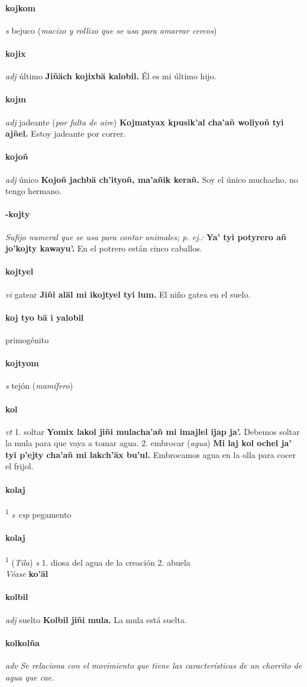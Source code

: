 \documentclass{scrbook}
\newcommand{\entry}[1]{\paragraph{#1}}
\newcommand{\onedefinition}[1]{#1.}
\newcommand{\defsuperscript}[1]{\textsuperscript{1}}
\newcommand{\nontranslationdef}[1]{\textit{#1}}
\newcommand{\partofspeech}[1]{\textit{#1}}
\newcommand{\spanishtranslation}[1]{#1}
\newcommand{\clarification}[1]{(\textit{#1})}
\newcommand{\cholexample}[1]{\textbf{#1}}
\newcommand{\exampletranslation}[1]{#1}
\newcommand{\alsosee}[1]{\\\textit{Véase} \textbf{#1}}
\newcommand{\relevantdialect}[1]{(\textit{#1})}
\begin{document}
\begin{multicols}{2}
\entry{kojkom}
\partofspeech{s}
\spanishtranslation{bejuco}
\clarification{macizo y rollizo que se usa para amarrar cercos}

\entry{kojix}
\partofspeech{adj}
\spanishtranslation{último}
\cholexample{Jiñäch kojixbä kalobil.}
\exampletranslation{Él es mi último hijo.}

\entry{kojm}
\partofspeech{adj}
\spanishtranslation{jadeante}
\clarification{por falta de aire}
\cholexample{Kojmatyax kpusik'al cha'añ woliyoñ tyi ajñel.}
\exampletranslation{Estoy jadeante por correr.}

\entry{kojoñ}
\partofspeech{adj}
\spanishtranslation{único}
\cholexample{Kojoñ jachbä ch'ityoñ, ma'añik kerañ.}
\exampletranslation{Soy el único muchacho, no tengo hermano.}

\entry{-kojty}
\nontranslationdef{Sufijo numeral que se usa para contar animales; p. ej.:}
\cholexample{Ya' tyi potyrero añ jo'kojty kawayu'.}
\exampletranslation{En el potrero están cinco caballos.}

\entry{kojtyel}
\partofspeech{vi}
\spanishtranslation{gatear}
\cholexample{Jiñi aläl mi ikojtyel tyi lum.}
\exampletranslation{El niño gatea en el suelo.}

\entry{koj tyo bä i yalobil}
\spanishtranslation{primogénito}

\entry{kojtyom}
\partofspeech{s}
\spanishtranslation{tejón}
\clarification{mamífero}

\entry{kol}
\partofspeech{vt}
\onedefinition{1}
\spanishtranslation{soltar}
\cholexample{Yomix lakol jiñi mulacha'añ mi imajlel ijap ja'.}
\exampletranslation{Debemos soltar la mula para que vaya a tomar agua.}
\onedefinition{2}
\spanishtranslation{embrocar}
\clarification{agua}
\cholexample{Mi laj kol ochel ja' tyi p'ejty cha'añ mi lakch'äx bu'ul.}
\exampletranslation{Embrocamos agua en la olla para cocer el frijol.}

\entry{kolaj}
\defsuperscript{1}
\partofspeech{s esp}
\spanishtranslation{pegamento}

\entry{kolaj}
\defsuperscript{2}
\relevantdialect{Tila}
\partofspeech{s}
\onedefinition{1}
\spanishtranslation{diosa del agua de la creación}
\onedefinition{2}
\spanishtranslation{abuela}
\alsosee{ko'äl}

\entry{kolbil}
\partofspeech{adj}
\spanishtranslation{suelto}
\cholexample{Kolbil jiñi mula.}
\exampletranslation{La mula está suelta.}

\entry{kolkolña}
\partofspeech{adv}
\nontranslationdef{Se relaciona con el movimiento que tiene las características de un chorrito de agua que cae.}


\end{multicols}
\end{document}

